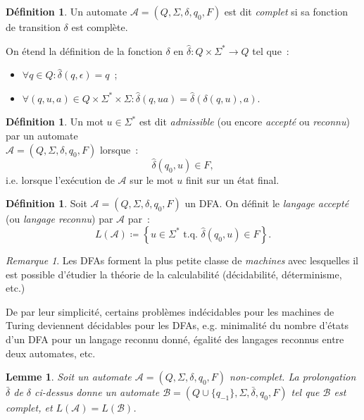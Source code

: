 \documentclass{article}
\newtheorem{lem}[thm]{Lemme}
\theoremstyle{definition}
\newtheorem{déf}[thm]{Définition}
\theoremstyle{remark}
\newtheorem*{rmq}{Remarque}
\newcommand{\tq}{\text{ t.q. }}
\newcommand{\automaton}{(Q, \Sigma, \delta, q_0, F)}
\begin{document}
	\begin{déf} Un automate $\mathcal A = \automaton$ est dit \textit{complet} si sa fonction de transition $\delta$ est complète.
	\end{déf}

	On étend la définition de la fonction $\delta$ en $\hat \delta : Q \times \Sigma^* \to Q$ tel que~:
	\begin{itemize}
		\item $\forall q \in Q : \hat \delta(q, \epsilon) = q$~;
		\item $\forall (q, u, a) \in Q \times \Sigma^* \times \Sigma : \hat \delta(q, ua) = \hat \delta(\delta(q, u), a)$.
	\end{itemize}

	\begin{déf} Un mot $u \in \Sigma^*$ est dit \textit{admissible} (ou encore \textit{accepté} ou \textit{reconnu}) par un automate\\
	$\mathcal A = \automaton$ lorsque~:
	\[\hat \delta(q_0, u) \in F,\]
	i.e. lorsque l'exécution de $\mathcal A$ sur le mot $u$ finit sur un état final.
	\end{déf}

	\begin{déf} Soit $\mathcal A = \automaton$ un DFA. On définit le \textit{langage accepté} (ou \textit{langage reconnu}) par $\mathcal A$ par~:
	\[L(\mathcal A) \coloneqq \left\{u \in \Sigma^* \tq \hat \delta(q_0, u) \in F\right\}.\]
	\end{déf}

	\begin{rmq} Les DFAs forment la plus petite classe de \textit{machines} avec lesquelles il est possible d'étudier la théorie de la calculabilité (décidabilité,
	déterminisme, etc.)

	De par leur simplicité, certains problèmes indécidables pour les machines de Turing deviennent décidables pour les DFAs, e.g. minimalité du nombre d'états
	d'un DFA pour un langage reconnu donné, égalité des langages reconnus entre deux automates, etc.
	\end{rmq}

	\begin{lem}\label{lem:complétion} Soit un automate $\mathcal A = \automaton$ non-complet. La prolongation $\bar \delta$ de $\delta$ ci-dessus donne un automate
	$\mathcal B = (Q \cup \{q_{-1}\}, \Sigma, \bar \delta, q_0, F)$ tel que $\mathcal B$ est complet, et $L(\mathcal A) = L(\mathcal B)$.
	\end{lem}
\end{document}
